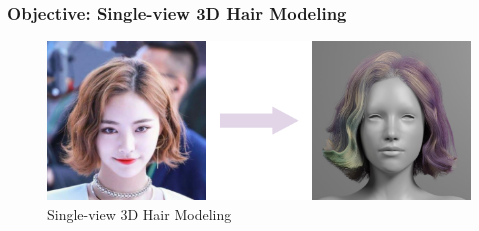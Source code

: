 \begin{frame}
    \frametitle{Objective: Single-view 3D Hair Modeling}
    \begin{figure}[H]
        \centering
        \includegraphics[width=0.8\linewidth]{assets/figures/task-intro.png}
        \caption{Single-view 3D Hair Modeling}
        \label{fig:task-intro}
    \end{figure}
\end{frame}